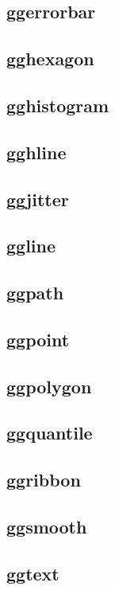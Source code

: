 \subsection{ggerrorbar}\label{sub:ggerrorbar}
\subsection{gghexagon}\label{sub:gghexagon}
\subsection{gghistogram}\label{sub:gghistogram}
\subsection{gghline}\label{sub:gghline}
\subsection{ggjitter}\label{sub:ggjitter}
\subsection{ggline}\label{sub:ggline}
\subsection{ggpath}\label{sub:ggpath}
\subsection{ggpoint}\label{sub:ggpoint}
\subsection{ggpolygon}\label{sub:ggpolygon}
\subsection{ggquantile}\label{sub:ggquantile}
\subsection{ggribbon}\label{sub:ggribbon}
\subsection{ggsmooth}\label{sub:ggsmooth}
\subsection{ggtext}\label{sub:ggtext}
